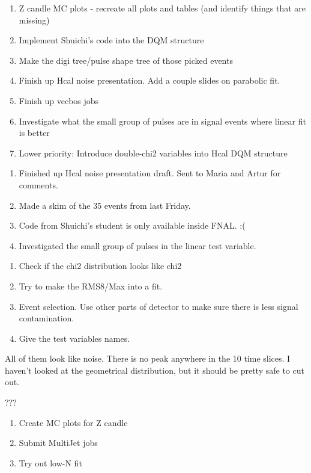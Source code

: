 

\begin{enumerate}
\item Z candle MC plots - recreate all plots and tables (and identify things that are missing)
\item Implement Shuichi's code into the DQM structure
\item Make the digi tree/pulse shape tree of those picked events
\item Finish up Hcal noise presentation.  Add a couple slides on parabolic fit.
\item Finish up vecbos jobs
\item Investigate what the small group of pulses are in signal events where linear fit is better
\item Lower priority: Introduce double-chi2 variables into Hcal DQM structure
\end{enumerate}


\begin{enumerate}
\item Finished up Hcal noise presentation draft.  Sent to Maria and Artur for comments.
\item Made a skim of the 35 events from last Friday.
\item Code from Shuichi's student is only available inside FNAL.  :(
\item Investigated the small group of pulses in the linear test variable.
\end{enumerate}


\begin{enumerate}
\item Check if the chi2 distribution looks like chi2
\item Try to make the RMS8/Max into a fit.
\item Event selection.  Use other parts of detector to make sure there is less signal contamination.
\item Give the test variables names.
\end{enumerate}


All of them look like noise.  There is no peak anywhere in the 10 time slices.  I haven't looked at the geometrical distribution,
but it should be pretty safe to cut out.


???


\begin{enumerate}
\item Create MC plots for Z candle
\item Submit MultiJet jobs
\item Try out low-N fit
\end{enumerate}


